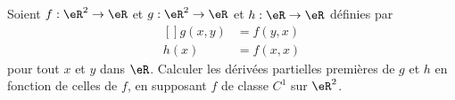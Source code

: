 \begin{exercice}\label{exoCalculDifferentiel0019}

 Soient $f : \eR ^2 \to \eR$ et $g : \eR ^2 \to \eR$ et $h : \eR \to
\eR$ définies par
\begin{equation}
	\begin{aligned}[]
		g(x,y) &= f(y,x)\\
		h(x) &= f(x,x)
	\end{aligned}
\end{equation}
pour tout $x$ et $y$ dans $\eR$. Calculer les dérivées partielles premières de $g$ et $h$ en fonction de celles de $f$, en supposant $f$ de classe $C^1$ sur $\eR^2$.\\

\end{exercice}
